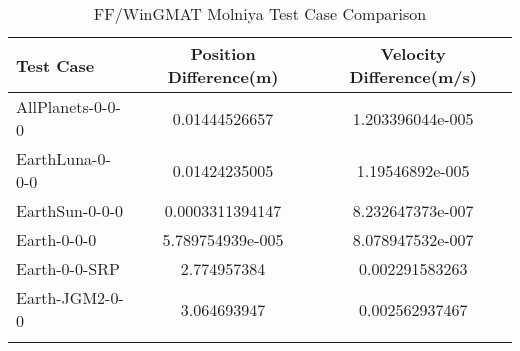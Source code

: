 \begin{table}[htbp!]
\centering
\caption{ FF/WinGMAT Molniya Test Case Comparison}
      \begin{tabular}{lcc}
      \hline\hline
          Test Case & Position Difference(m) & Velocity Difference(m/s) \\
         \hline
         AllPlanets-0-0-0 & 0.01444526657 & 1.203396044e-005 \\
         EarthLuna-0-0-0 & 0.01424235005 & 1.19546892e-005 \\
         EarthSun-0-0-0 & 0.0003311394147 & 8.232647373e-007 \\
         Earth-0-0-0 & 5.789754939e-005 & 8.078947532e-007 \\
         Earth-0-0-SRP & 2.774957384 & 0.002291583263 \\
         Earth-JGM2-0-0 & 3.064693947 & 0.002562937467 \\
      \hline\hline
      \label{Table: Molniya FF-WinGMAT Table} 
\end{tabular}
\end{table}
